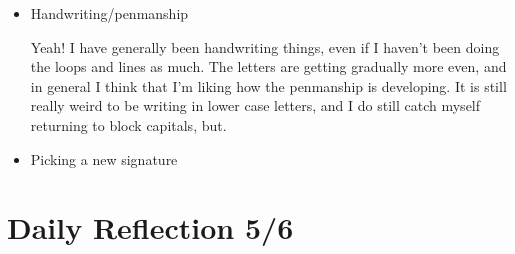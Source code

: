 \documentclass[12pt]{article}
\renewcommand{\,}{\textsuperscript{,}}
\begin{document}
\begin{enumerate}
\begin{itemize}
\item Handwriting/penmanship

Yeah! I have generally been handwriting things, even if I haven't been doing the loops and lines as much.  
The letters are getting gradually more even, and in general I think that I'm liking how the penmanship is developing.  
It is still really weird to be writing in lower case letters, and I do still catch myself returning to block capitals, but.

\item Picking a new signature

\end{itemize}

\end{enumerate}

\section{Daily Reflection 5/6}
\end{document}
